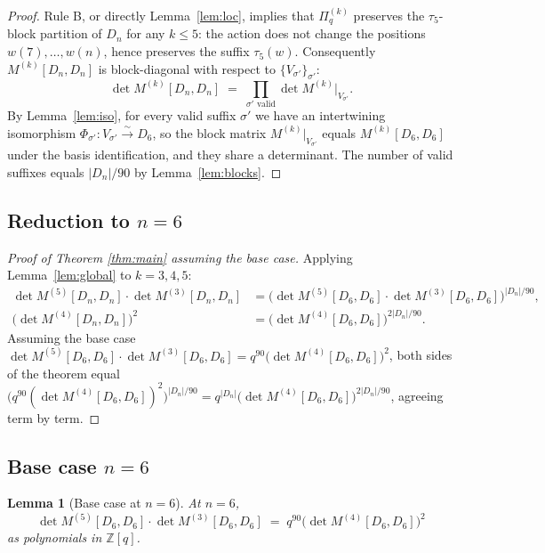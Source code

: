 \documentclass[11pt]{article}
\newtheorem{lemma}[theorem]{Lemma}
\theoremstyle{definition}
\begin{document}
\begin{proof}
Rule B, or directly Lemma~\ref{lem:loc}, implies that $\Pi^{(k)}_q$ preserves
the $\tau_5$-block partition of $D_n$ for any $k \leq 5$: the action does not
change the positions $w(7), \ldots, w(n)$, hence preserves the suffix
$\tau_5(w)$. Consequently $M^{(k)}[D_n, D_n]$ is block-diagonal with respect
to $\{V_{\sigma'}\}_{\sigma'}$:
\[
\det M^{(k)}[D_n, D_n] \;=\; \prod_{\sigma' \text{ valid}}
\det M^{(k)}\bigl|_{V_{\sigma'}}.
\]
By Lemma~\ref{lem:iso}, for every valid suffix $\sigma'$ we have an
intertwining isomorphism $\Phi_{\sigma'} : V_{\sigma'} \xrightarrow{\sim} D_6$,
so the block matrix $M^{(k)}|_{V_{\sigma'}}$ equals $M^{(k)}[D_6, D_6]$ under
the basis identification, and they share a determinant. The number of valid
suffixes equals $|D_n|/90$ by Lemma~\ref{lem:blocks}.
\end{proof}

\subsection{Reduction to $n = 6$}

\begin{proof}[Proof of Theorem \ref{thm:main} assuming the base case]
Applying Lemma~\ref{lem:global} to $k=3, 4, 5$:
\begin{align*}
\det M^{(5)}[D_n, D_n] \cdot \det M^{(3)}[D_n, D_n]
&= \bigl( \det M^{(5)}[D_6, D_6] \cdot \det M^{(3)}[D_6, D_6]\bigr)^{|D_n|/90}, \\
\bigl( \det M^{(4)}[D_n, D_n] \bigr)^2
&= \bigl( \det M^{(4)}[D_6, D_6] \bigr)^{2 |D_n|/90}.
\end{align*}
Assuming the base case
$\det M^{(5)}[D_6, D_6] \cdot \det M^{(3)}[D_6, D_6] = q^{90} \bigl(\det M^{(4)}[D_6, D_6]\bigr)^2$,
both sides of the theorem equal
$\bigl(q^{90}(\det M^{(4)}[D_6, D_6])^2\bigr)^{|D_n|/90}
= q^{|D_n|} \bigl(\det M^{(4)}[D_6, D_6]\bigr)^{2|D_n|/90}$,
agreeing term by term.
\end{proof}

\subsection{Base case $n = 6$}

\begin{lemma}[Base case at $n=6$]
\label{lem:base}
At $n = 6$,
\[
\det M^{(5)}[D_6, D_6] \cdot \det M^{(3)}[D_6, D_6]
\;=\; q^{90} \bigl(\det M^{(4)}[D_6, D_6]\bigr)^2
\]
as polynomials in $\mathbb{Z}[q]$.
\end{lemma}
\end{document}
